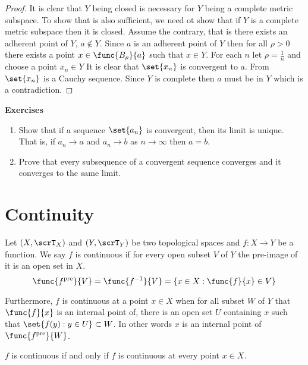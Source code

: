 \begin{proof}
    It is clear that \(Y\) being closed is necessary for \(Y\) being a complete metric subspace. To show that is also sufficient, we need ot show that if \(Y\) is a complete metric subspace then it is closed. Assume the contrary, that is there exists an adherent point of \(Y\), \(a \notin Y\). Since \(a\) is an adherent point of \(Y\) then for all \(\rho > 0\) there exists a point \(x \in \func{B_\rho}{a}\) such that \(x \in Y\). For each \(n\) let \(\rho = \frac{1}{n}\) and choose a point \(x_n \in Y\)
    It is clear that \(\set{ x_n }\) is convergent to \(a\). From  \(\set{ x_n }\) is a Cauchy sequence. Since \(Y\) is complete then \(a\) must be in \(Y\) which is a contradiction.
\end{proof}
{\Large\textbf{Exercises}}
\begin{enumerate}
    \item Show that if a sequence \(\set{ a_n }\) is convergent, then its limit is unique. That is, if \(a_n \to a \) and \(a_n \to b\) as \(n \to \infty\) then \(a = b\).
    \item Prove that every subsequence of a convergent sequence converges and it converges to the same limit.
\end{enumerate}
\newpage

\section{Continuity}
\begin{definition} [Continuity]
    Let \((X,\scrT_X)\) and \((Y,\scrT_Y)\) be two topological spaces and \(f : X \to Y\) be a function. We say \(f\) is continuous if for every open subset \(V\) of \(Y\) the pre-image of it is an open set in \(X\).
    \[\func{f^{\mathrm{pre}}}{V}= \func{f^{-1}}{V} = \{ x \in X : \func{f}{x} \in V\} \]

    Furthermore, \(f\) is continuous at a point \(x \in X\) when for all subset \(W\) of  \(Y\) that \( \func{f}{x} \) is an internal point of, there is an open set \(U\) containing \(x\) such that \(\set{ f(y) : y \in U } \subset W\). In other words \(x\) is an internal point of \(\func{f^{\mathrm{pre}}}{W}\).
\end{definition}

\begin{proposition}
    \(f\) is continuous if and only if \(f\) is continuous at every point \(x \in X\).
\end{proposition}

